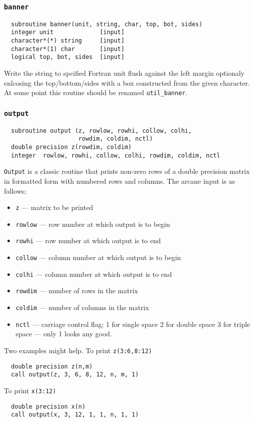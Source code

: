 \subsubsection{{\tt banner}}
\begin{verbatim}
  subroutine banner(unit, string, char, top, bot, sides)
  integer unit             [input]
  character*(*) string     [input]
  character*(1) char       [input]
  logical top, bot, sides  [input]
\end{verbatim}
Write the string to spcified Fortran unit flush against the left
margin optionaly enlcosing the top/bottom/sides with a box constructed
from the given character.  At some point this routine should be renamed
\verb+util_banner+. 

\subsubsection{{\tt output}}
\begin{verbatim}
  subroutine output (z, rowlow, rowhi, collow, colhi,
                     rowdim, coldim, nctl)
  double precision z(rowdim, coldim)
  integer  rowlow, rowhi, collow, colhi, rowdim, coldim, nctl
\end{verbatim}
{\tt Output} is a classic routine that prints non-zero rows of a
double precision matrix in formatted form with numbered rows
and columns.  The arcane input is as follows;
\begin{itemize}
\item  {\tt z} --- matrix to be printed
\item  {\tt rowlow} --- row number at which output is to begin
\item  {\tt rowhi} --- row number at which output is to end
\item  {\tt collow} --- column number at which output is to begin
\item  {\tt colhi} --- column number at which output is to end
\item  {\tt rowdim} --- number of rows in the matrix
\item  {\tt coldim} --- number of columns in the matrix
\item {\tt nctl} --- carriage control flag; 1 for single space 2 for
  double space 3 for triple space --- only 1 looks any good.
\end{itemize}
Two examples might help.  To print {\tt z(3:6,8:12)}
\begin{verbatim}
  double precision z(n,m)
  call output(z, 3, 6, 8, 12, n, m, 1)
\end{verbatim}
To print {\tt x(3:12)}
\begin{verbatim}
  double precision x(n)
  call output(x, 3, 12, 1, 1, n, 1, 1)
\end{verbatim}

